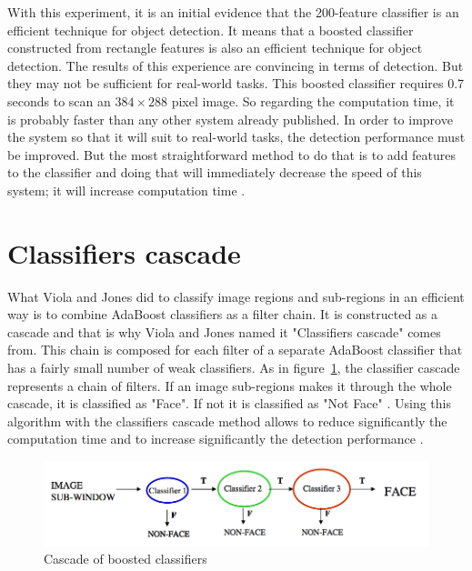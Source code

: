 \noindent With this experiment, it is an initial evidence that the 200-feature classifier is an efficient technique for object detection. It means that a boosted classifier constructed from rectangle features is also an efficient technique for object detection. The results of this experience are convincing in terms of detection. But they may not be sufficient for real-world tasks. This boosted classifier requires 0.7 seconds to scan an $ 384\times288 $ pixel image. So regarding the computation time, it is probably faster than any other system already published. In order to improve the system so that it will suit to real-world tasks, the detection performance must be improved. But the most straightforward method to do that is to add features to the classifier and doing that will immediately decrease the speed of this system; it will increase computation time \cite{VIO01}.
\newline

\section{Classifiers cascade}

\vspace{\baselineskip}
\noindent What Viola and Jones did to classify image regions and sub-regions in an efficient way is to combine AdaBoost classifiers as a filter chain. It is constructed as a cascade and that is why Viola and Jones named it  "Classifiers cascade" comes from. This chain is composed for each filter of a separate AdaBoost classifier that has a fairly small number of weak classifiers. As in figure~\ref{haar_feature_cascade}, the classifier cascade represents a chain of filters. If an image sub-regions makes it through the whole cascade, it is classified as "Face". If not it is classified as "Not Face" \cite{HEW07}. Using this algorithm with the classifiers cascade method allows to reduce significantly the computation time and to increase significantly the detection performance \cite{VIO01}.
\newline

\begin{figure}[!h]
\begin{center}
\noindent \includegraphics[scale=0.5]{figures/haar_feature_cascade} 
\newline
\caption{Cascade of boosted classifiers}
\label{haar_feature_cascade}
\end{center} 
\end{figure}

